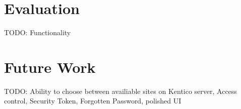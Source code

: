 \section{Evaluation}
TODO: Functionality
\section{Future Work}
TODO: Ability to choose between availiable sites on Kentico server, Access control, Security Token, Forgotten Password, polished UI
